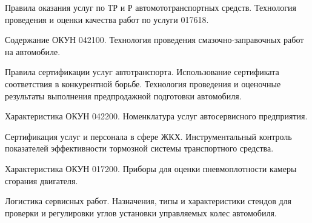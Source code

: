 \documentclass[
	14pt,
	a4paper,
	]
	{scrartcl}
\begin{document}
\newpage


\shapk
{}
\setcounter{zad}{0}

\vfill
\z Правила оказания услуг по ТР и Р автомототранспортных средств.
 \vfill
\z Технология проведения и оценки качества работ по услуги 017618.
 \vfill

\vfill

\newpage


\shapk
{}
\setcounter{zad}{0}

\vfill
\z Содержание ОКУН 042100.
 \vfill
\z Технология проведения смазочно-заправочных работ на автомобиле.
 \vfill

\vfill

\newpage


\shapk
{}
\setcounter{zad}{0}

\vfill
\z Правила сертификации услуг автотранспорта. Использование сертификата соответствия в конкурентной борьбе.
 \vfill
\z Технология проведения и оценочные результаты выполнения предпродажной подготовки автомобиля.
 \vfill

\vfill

\newpage


\shapk
{}
\setcounter{zad}{0}

\vfill
\z Характеристика ОКУН 042200.
 \vfill
\z Номенклатура услуг автосервисного предприятия.
 \vfill

\vfill

\newpage


\shapk
{}
\setcounter{zad}{0}

\vfill
\z Сертификация услуг и персонала в сфере ЖКХ.
 \vfill
\z Инструментальный контроль показателей эффективности тормозной системы транспортного средства.
 \vfill

\vfill

\newpage


\shapk
{}
\setcounter{zad}{0}

\vfill
\z Характеристика ОКУН 017200.
 \vfill
\z Приборы для оценки пневмоплотности камеры сгорания двигателя.
 \vfill

\vfill

\newpage


\shapk
{}
\setcounter{zad}{0}

\vfill
\z Логистика сервисных работ.
 \vfill
\z Назначения, типы и характеристики стендов для проверки и регулировки углов установки управляемых колес автомобиля.
 \vfill
\end{document}
